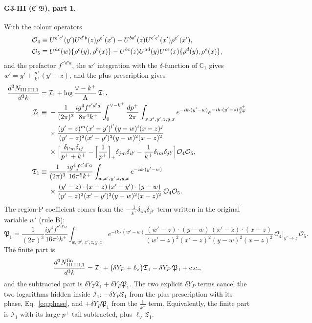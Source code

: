 \documentclass[aps,prd,onecolumn,superscriptaddress,nofootinbib,floatfix,longbibliography,11pt]{revtex4-2}
\numberwithin{equation}{section}
\def\mf#1{\mathbb{#1}}
\newcommand{\lV}{\ell_{\vee}}
\newcommand{\Ord}{\mathcal{O}}
\begin{document}
\paragraph*{G3-III ($\mathfrak C^\dagger\mathfrak B$), part 1.} With the colour operators
\begin{align}
\Ord_4&\equiv U^{e'c'}(y')U^{d'b}(z)\rho^{e'}(x')-U^{bd'}(z)U^{c'e'}(x')\rho^{e'}(x'),\notag\\
\Ord_5&\equiv U^{ac}(w)\{\rho^c(y),\rho^b(x)\}-U^{bc}(z)U^{ad}(y)U^{ce}(x)\{\rho^d(y),\rho^e(x)\},
\end{align}
and the prefactor $f^{c'd'a}$, the $w'$ integration with the $\delta$-function of $\mf C_1$ gives $w'=y'+\frac{p^+}{k^+}(y'-z)$, and the plus prescription gives
\begin{align}
\frac{d^3N_{\rm III.III,1}}{d^3k}={}&\mathcal I_1+\log\frac{\vee-k^+}{\Lambda}\,\mathfrak T_1,\notag\\
\mathcal I_1\equiv{}&-\frac{1}{(2\pi)^3}\frac{ig^4f^{c'd'a}}{8\pi^4k^+}\int_0^{\vee-k^+}\frac{dp^+}{2\pi}\int_{w,x',y',z,y,x}e^{-ik\cdot(y'-w)}e^{-ik\cdot(y'-z)\frac{p^+}{k^+}}\notag\\
&\times\frac{(y'-z)^m(x'-y')^{l'}(y-w)^i(x-z)^j}{(y'-z)^2(x'-y')^2(y-w)^2(x-z)^2}\notag\\
&\times\Big[\frac{\delta_{l'm}\delta_{ij}}{p^++k^+}-\Big[\frac{1}{p^+}\Big]_+\delta_{jm}\delta_{il'}-\frac{1}{k^+}\delta_{im}\delta_{jl'}\Big]\Ord_4\Ord_5,\notag\\
\mathfrak T_1\equiv{}&\frac{1}{(2\pi)^3}\frac{ig^4f^{c'd'a}}{16\pi^5k^+}\int_{w,x',y',z,y,x}e^{-ik\cdot(y'-w)}\notag\\
&\times\frac{(y'-z)\cdot(x-z)\,(x'-y')\cdot(y-w)}{(y'-z)^2(x'-y')^2(y-w)^2(x-z)^2}\,\Ord_4\Ord_5.
\label{eq:GIIIIII1}
\end{align}
The region-P coefficient comes from the $-\frac{1}{k^+}\delta_{im}\delta_{jl'}$ term written in the original variable $w'$ (rule B):
\begin{equation}
\mathfrak P_1=\frac{1}{(2\pi)^3}\frac{ig^4f^{c'd'a}}{16\pi^5k^+}\int_{w,w',x',z,y,x}e^{-ik\cdot(w'-w)}\frac{(w'-z)\cdot(y-w)\,(x'-z)\cdot(x-z)}{(w'-z)^2(x'-z)^2(y-w)^2(x-z)^2}\,\Ord_4\big|_{y'\to z}\,\Ord_5.
\end{equation}
The finite part is
\begin{equation}
\frac{d^3N^{\rm fin}_{\rm III.III,1}}{d^3k}=\mathcal I_1+\big(\delta Y_P+\lV\big)\mathfrak T_1-\delta Y_P\,\mathfrak P_1+{\rm c.c.},
\label{eq:finGIIIIII1}
\end{equation}
and the subtracted part is $\delta Y_T\mathfrak T_1+\delta Y_P\mathfrak P_1$. The two explicit $\delta Y_P$ terms cancel the two logarithms hidden inside $\mathcal I_1$: $-\delta Y_P\mathfrak T_1$ from the plus prescription with its phase, Eq.~\eqref{eq:phase}, and $+\delta Y_P\mathfrak P_1$ from the $\frac{1}{k^+}$ term. Equivalently, the finite part is $\mathcal I_1$ with its large-$p^+$ tail subtracted, plus $\lV\mathfrak T_1$.
\end{document}
